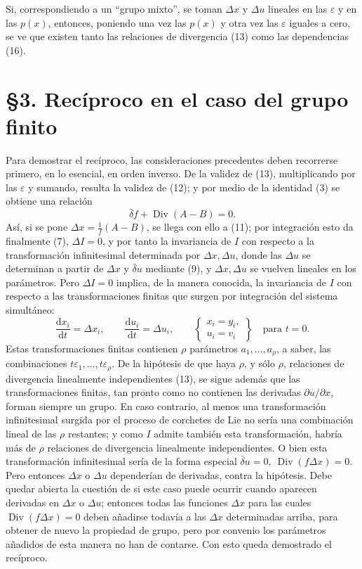 \documentclass[11pt]{article}
\newcommand{\D}{\Delta}
\newcommand{\eps}{\varepsilon}
\providecommand{\dd}{\mathrm d}
\providecommand{\Div}{\operatorname{Div}}
\providecommand{\bd}{\bar{\delta}}
\providecommand{\p}{\partial}
\begin{document}
Si, correspondiendo a un ``grupo mixto'', se toman \(\D x\) y \(\D u\) lineales en las \(\eps\) y en las \(p(x)\), entonces, poniendo una vez las \(p(x)\) y otra vez las \(\eps\) iguales a cero, se ve que existen tanto las relaciones de divergencia (13) como las dependencias (16).

\section*{\S{}3. Recíproco en el caso del grupo finito}

Para demostrar el recíproco, las consideraciones precedentes deben recorrerse primero, en lo esencial, en orden inverso. De la validez de (13), multiplicando por las \(\eps\) y sumando, resulta la validez de (12); y por medio de la identidad (3) se obtiene una relación
\[
\bd f+\Div(A-B)=0.
\]
Así, si se pone \(\D x=\frac1f(A-B)\), se llega con ello a (11); por integración esto da finalmente (7), \(\D I=0\), y por tanto la invariancia de \(I\) con respecto a la transformación infinitesimal determinada por \(\D x,\D u\), donde las \(\D u\) se determinan a partir de \(\D x\) y \(\bd u\) mediante (9), y \(\D x,\D u\) se vuelven lineales en los parámetros. Pero \(\D I=0\) implica, de la manera conocida, la invariancia de \(I\) con respecto a las transformaciones finitas que surgen por integración del sistema simultáneo:
\begin{equation}
\frac{\dd x_i}{\dd t}=\D x_i,\qquad
\frac{\dd u_i}{\dd t}=\D u_i,\qquad
\left\{\begin{array}{l}
x_i=y_i,\\
u_i=v_i
\end{array}\right\}
\quad\text{para }t=0.
\tag{17}
\end{equation}
Estas transformaciones finitas contienen \(\rho\) parámetros \(a_1,\ldots,a_\rho\), a saber, las combinaciones \(t\eps_1,\ldots,t\eps_\rho\). De la hipótesis de que haya \(\rho\), y sólo \(\rho\), relaciones de divergencia linealmente independientes (13), se sigue además que las transformaciones finitas, tan pronto como no contienen las derivadas \(\p u/\p x\), forman siempre un grupo. En caso contrario, al menos una transformación infinitesimal surgida por el proceso de corchetes de Lie no sería una combinación lineal de las \(\rho\) restantes; y como \(I\) admite también esta transformación, habría más de \(\rho\) relaciones de divergencia linealmente independientes. O bien esta transformación infinitesimal sería de la forma especial \(\bd u=0,\ \Div(f\D x)=0\). Pero entonces \(\D x\) o \(\D u\) dependerían de derivadas, contra la hipótesis. Debe quedar abierta la cuestión de si este caso puede ocurrir cuando aparecen derivadas en \(\D x\) o \(\D u\); entonces todas las funciones \(\D x\) para las cuales \(\Div(f\D x)=0\) deben añadirse todavía a las \(\D x\) determinadas arriba, para obtener de nuevo la propiedad de grupo, pero por convenio los parámetros añadidos de esta manera no han de contarse. Con esto queda demostrado el recíproco.
\end{document}
